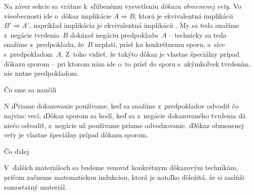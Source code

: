 Na záver sekcie sa vráťme k~sľúbenému vysvetleniu \textit{dôkazu obmenenej vety}. Vo všeobecnosti ide o~dôkaz implikácie $A \Rightarrow B$, ktorá je ekvivalentná implikácii $B' \Rightarrow A'$, napríklad implikácia  je ekvivalentná implikácii . My sa teda snažíme z~negácie tvrdenia~$B$ dokázať negáciu predpokladu~$A$ -- technicky sa teda snažíme z~predpokladu, že~$B$ neplatí, prísť ku konkrétnemu sporu, a~síce s~predpokladom~$A$. Z~toho vidieť, že takýto dôkaz je vlastne špeciálny prípad dôkazu sporom -- pri ktorom nám ide o~to prísť do sporu s~akýmkoľvek tvrdením, nie nutne predpokladom.

\sec Čo sme sa naučili 

\begitems \style N
\i Priame dokazovanie používame, keď sa snažíme z~predpokladov odvodiť čo najviac vecí.
\i Dôkaz sporom sa hodí, keď sa z~negácie dokazovaného tvrdenia dá niečo odvodiť, z~negácie už používame priame odvodzovanie.
\i Dôkaz obmenenej vety je vlastne špeciálny prípad dôkazu sporom.
\enditems 

\sec Čo ďalej

V~ďalších materiáloch sa budeme venovať konkrétnym dôkazovým technikám, pričom začneme matematickou indukciou, ktorá je natoľko dôležitá, že si zaslúži samostatný materiál.

\DisplayExerciseSolutions

\DisplayHints

\DisplayProblemSolutions

\bye